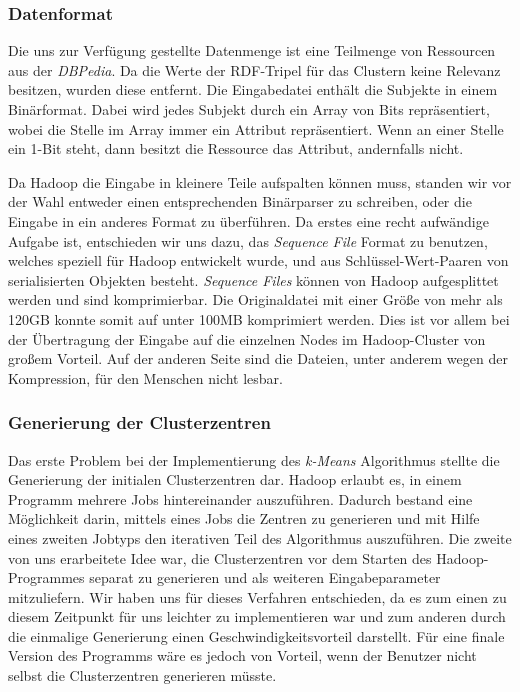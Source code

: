 \documentclass[a4paper]{llncs}
\begin{document}
\subsubsection{Datenformat}
Die uns zur Verfügung gestellte Datenmenge ist eine Teilmenge von Ressourcen aus der \emph{DBPedia}.
Da die Werte der RDF-Tripel für das Clustern keine Relevanz besitzen, wurden diese entfernt.
Die Eingabedatei enthält die Subjekte in einem Binärformat. Dabei wird jedes Subjekt durch ein Array von Bits repräsentiert, wobei die Stelle im Array immer ein Attribut repräsentiert. Wenn an einer Stelle ein 1-Bit steht, dann besitzt die Ressource das Attribut, andernfalls nicht.

Da Hadoop die Eingabe in kleinere Teile aufspalten können muss, standen wir vor der Wahl entweder einen entsprechenden Binärparser zu schreiben, oder die Eingabe in ein anderes Format zu überführen.
Da erstes eine recht aufwändige Aufgabe ist, entschieden wir uns dazu, das \emph{Sequence File} Format zu benutzen, welches speziell für Hadoop entwickelt wurde, und aus Schlüssel-Wert-Paaren von serialisierten Objekten besteht.
\emph{Sequence Files} können von Hadoop aufgesplittet werden und sind komprimierbar. 
Die Originaldatei mit einer Größe von mehr als 120GB konnte somit auf unter 100MB komprimiert werden.
Dies ist vor allem bei der Übertragung der Eingabe auf die einzelnen Nodes im Hadoop-Cluster von großem Vorteil.
Auf der anderen Seite sind die Dateien, unter anderem wegen der Kompression, für den Menschen nicht lesbar.

\subsubsection{Generierung der Clusterzentren}
Das erste Problem bei der Implementierung des \emph{k-Means} Algorithmus stellte die Generierung der initialen Clusterzentren dar. Hadoop erlaubt es, in einem Programm mehrere Jobs hintereinander auszuführen. Dadurch bestand eine Möglichkeit darin, mittels eines Jobs die Zentren zu generieren und mit Hilfe eines zweiten Jobtyps den iterativen Teil des Algorithmus auszuführen. Die zweite von uns erarbeitete Idee war, die Clusterzentren vor dem Starten des Hadoop-Programmes separat zu generieren und als weiteren Eingabeparameter mitzuliefern. Wir haben uns für dieses Verfahren entschieden, da es zum einen zu diesem Zeitpunkt für uns leichter zu implementieren war und zum anderen durch die einmalige Generierung einen Geschwindigkeitsvorteil darstellt. Für eine finale Version des Programms wäre es jedoch von Vorteil, wenn der Benutzer nicht selbst die Clusterzentren generieren müsste.
\end{document}
